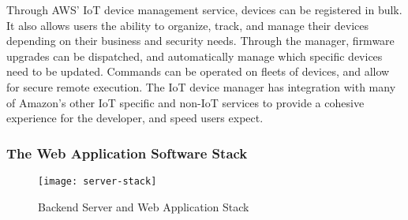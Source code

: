 Through AWS' IoT device management service, devices can be registered in bulk.
It also allows users the ability to organize, track, and manage their devices
depending on their business and security needs. Through the manager, firmware
upgrades can be dispatched, and automatically manage which specific devices need
to be updated. Commands can be operated on fleets of devices, and allow for
secure remote execution. The IoT device manager has integration with many of
Amazon's other IoT specific and non-IoT services to provide a cohesive
experience for the developer, and speed users expect.

\subsubsection{The Web Application Software Stack}

\begin{figure}
  \centering
  \texttt{[image: server-stack]}
  \caption{Backend Server and Web Application Stack}
  \label{server-stack}
\end{figure}
